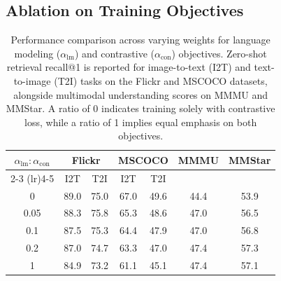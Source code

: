 \subsection{Ablation on Training Objectives}
\begin{table}[t]
\centering
\caption{
    Performance comparison across varying weights for language modeling ($\alpha_{\text{lm}}$) and contrastive ($\alpha_{\text{con}}$) objectives.
    Zero-shot retrieval recall@1 is reported for image-to-text (I2T) and text-to-image (T2I) tasks on the Flickr and MSCOCO datasets, alongside multimodal understanding scores on MMMU and MMStar. 
    A ratio of 0 indicates training solely with contrastive loss, while a ratio of 1 implies equal emphasis on both objectives.
}
\setlength{\tabcolsep}{4pt}
\begin{tabular}{ccccccc}
\toprule
\multicolumn{1}{c}{$\alpha_{\text{lm}}:\alpha_{\text{con}}$} 
& \multicolumn{2}{c}{Flickr} 
& \multicolumn{2}{c}{MSCOCO} 
& MMMU & MMStar \\
\cmidrule(lr){2-3} \cmidrule(lr){4-5}
& I2T & T2I & I2T & T2I & & \\
\midrule
0 & 89.0 & 75.0 & 67.0 & 49.6 & 44.4 & 53.9 \\
0.05 & 88.3 & 75.8 & 65.3 & 48.6 & 47.0 & 56.5 \\
0.1 & 87.5 & 75.3 & 64.4 & 47.9 & 47.0 & 56.8 \\
0.2 & 87.0 & 74.7 & 63.3 & 47.0 & 47.4 & 57.3 \\
1 & 84.9 & 73.2 & 61.1 & 45.1 & 47.4 & 57.1 \\
\bottomrule
\end{tabular}
\label{tab:loss}
\end{table}
%

